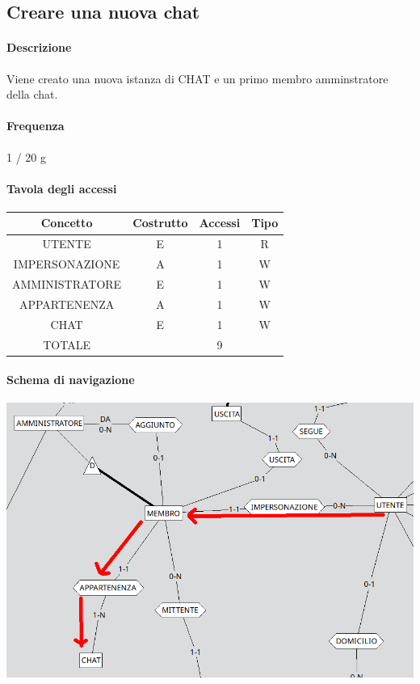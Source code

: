 \documentclass[a4paper,12pt]{report}
\begin{document}
\subsection{Creare una nuova chat} \label{nuova_chat}
\paragraph{Descrizione} Viene creato una nuova istanza di CHAT e un primo membro amminstratore della chat.
\paragraph{Frequenza} 1 / 20 g
\begin{table}[H]
\paragraph{Tavola degli accessi\newline}
\begin{tabular}{|c|c|c|c|}
\hline
Concetto       & Costrutto & Accessi & Tipo \\ \hline
UTENTE         & E         & 1       & R    \\ \hline
IMPERSONAZIONE & A         & 1       & W    \\ \hline
AMMINISTRATORE & E         & 1       & W    \\ \hline
APPARTENENZA   & A         & 1       & W    \\ \hline
CHAT           & E         & 1       & W    \\ \hline
TOTALE         &           & 9       &      \\ \hline
\end{tabular}
\end{table}
\paragraph{Schema di navigazione\newline}
\includegraphics[scale=0.5]{./img/creare_chat.png}
\end{document}
